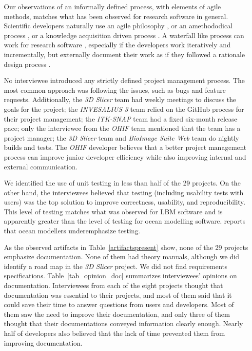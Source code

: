 \documentclass[final, 3p, times, authoryear]{elsarticle}
\begin{document}
Our observations of an informally defined process, with elements of agile
methods, matches what has been observed for research software in general.
Scientific developers naturally use an agile philosophy \citep{AckroydEtAl2008,
CarverEtAl2007, EasterbrookAndJohns2009, Segal2005, HeatonAndCarver2015}, or an
amethododical process \citep{Kelly2013}, or a knowledge acquisition driven
process \citep{Kelly2015}.  A waterfall like process can work for research
software \citep{Smith2016}, especially if the developers work iteratively and
incrementally, but externally document their work as if they followed a
rationale design process \citep{parnas1986rational}.

No interviewee introduced any strictly defined project management process. The
most common approach was following the issues, such as bugs and feature
requests. Additionally, the \textit{3D Slicer} team had weekly meetings to
discuss the goals for the project; the \textit{INVESALIUS 3} team relied on the
GitHub process for their project management; the \textit{ITK-SNAP} team had a
fixed six-month release pace; only the interviewee from the \textit{OHIF} team
mentioned that the team has a project manager; the \textit{3D Slicer} team and
\textit{BioImage Suite Web} team do nightly builds and tests. The \textit{OHIF}
developer believes that a better project management process can improve junior
developer efficiency while also improving internal and external communication.

We identified the use of unit testing in less than half of the 29 projects. On
the other hand, the interviewees believed that testing (including usability
tests with users) was the top solution to improve correctness, usability, and
reproducibility.  This level of testing matches what was observed for LBM
software \citep{Michalski2021} and is apparently greater than the level of
testing for ocean modelling software.  \citet{JungEtAl2022} reports that ocean
modellers underemphasize testing.

As the observed artifacts in Table~\ref{artifactspresent} show, none of the 29
projects emphasize documentation. None of them had theory manuals, although we
did identify a road map in the \textit{3D Slicer} project.  We did not find
requirements specifications. Table~\ref{tab_opinion_doc} summarizes
interviewees' opinions on documentation. Interviewees from each of the eight
projects thought that documentation was essential to their projects, and most of
them said that it could save their time to answer questions from users and
developers. Most of them saw the need to improve their documentation, and only
three of them thought that their documentations conveyed information clearly
enough. Nearly half of developers also believed that the lack of time prevented
them from improving documentation.
\end{document}
